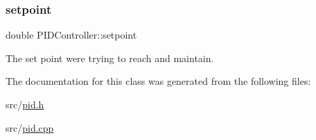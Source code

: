 \subsubsection{\texorpdfstring{setpoint}{setpoint}}
{\footnotesize\ttfamily double P\+I\+D\+Controller\+::setpoint\hspace{0.3cm}{\ttfamily [private]}}



The set point we\textquotesingle{}re trying to reach and maintain. 



The documentation for this class was generated from the following files\+:\begin{DoxyCompactItemize}
\item 
src/\mbox{\hyperlink{pid_8h}{pid.\+h}}\item 
src/\mbox{\hyperlink{pid_8cpp}{pid.\+cpp}}\end{DoxyCompactItemize}
